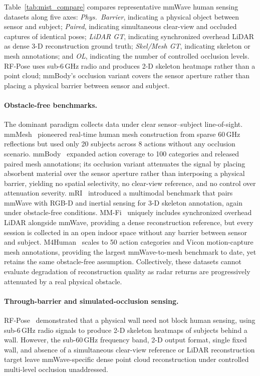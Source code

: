 \documentclass{article}
\begin{document}
Table~\ref{tab:mist_compare} compares representative mmWave human sensing datasets along
five axes: \emph{Phys.\ Barrier}, indicating a physical object between sensor and subject;
\emph{Paired}, indicating simultaneous clear-view and occluded captures of identical poses;
\emph{LiDAR GT}, indicating synchronized overhead LiDAR as dense 3-D reconstruction ground truth;
\emph{Skel/Mesh GT}, indicating skeleton or mesh annotations; and \emph{OL}, indicating the
number of controlled occlusion levels.
RF-Pose uses sub-6\,GHz radio and produces 2-D skeleton heatmaps rather than a point cloud;
mmBody's occlusion variant covers the sensor aperture rather than placing a physical barrier
between sensor and subject.

\paragraph{Obstacle-free benchmarks.}
The dominant paradigm collects data under clear sensor--subject line-of-sight.
mmMesh~\cite{mmmesh} pioneered real-time human mesh construction from sparse 60\,GHz
reflections but used only 20 subjects across 8 actions without any occlusion scenario.
mmBody~\cite{mmbody} expanded action coverage to 100 categories and released paired mesh
annotations; its occlusion variant attenuates the signal by placing absorbent material
over the sensor aperture rather than interposing a physical barrier, yielding no
spatial selectivity, no clear-view reference, and no control over attenuation severity.
mRI~\cite{mri} introduced a multimodal benchmark that pairs mmWave with RGB-D and inertial
sensing for 3-D skeleton annotation, again under obstacle-free conditions.
MM-Fi~\cite{yang2023mmfi} uniquely includes synchronized overhead LiDAR alongside mmWave,
providing a dense reconstruction reference, but every session is collected in an open
indoor space without any barrier between sensor and subject.
M4Human~\cite{m4human} scales to 50 action categories and Vicon motion-capture mesh
annotations, providing the largest mmWave-to-mesh benchmark to date, yet retains the
same obstacle-free assumption.
Collectively, these datasets cannot evaluate degradation of reconstruction quality as
radar returns are progressively attenuated by a real physical obstacle.

\paragraph{Through-barrier and simulated-occlusion sensing.}
RF-Pose~\cite{rfpose} demonstrated that a physical wall need not block human sensing, using
sub-6\,GHz radio signals to produce 2-D skeleton heatmaps of subjects behind a wall.
However, the sub-60\,GHz frequency band, 2-D output format, single fixed wall, and absence
of a simultaneous clear-view reference or LiDAR reconstruction target leave mmWave-specific
dense point cloud reconstruction under controlled multi-level occlusion unaddressed.
\end{document}
